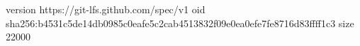 version https://git-lfs.github.com/spec/v1
oid sha256:b4531c5de14db0985c0eafe5c2cab4513832f09e0ea0efe7fe8716d83ffff1c3
size 22000
